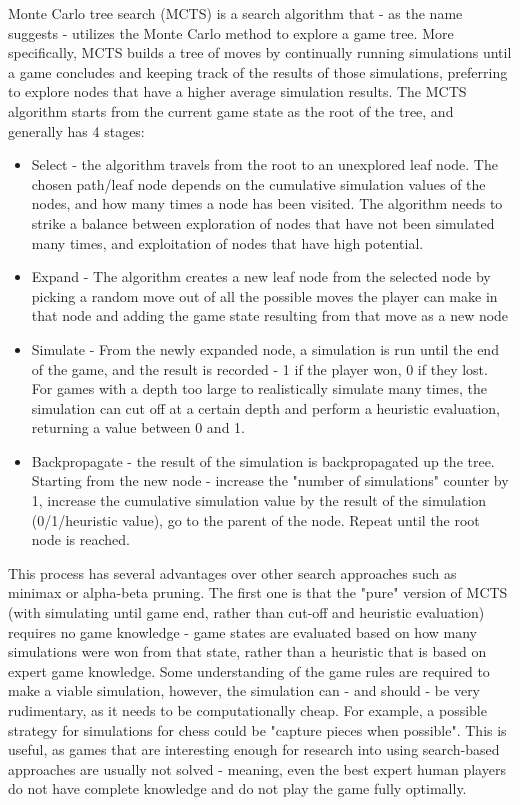 Monte Carlo tree search (MCTS) \cite{Coulom2007MonteCarlo} is a search algorithm that - as the name suggests - utilizes the Monte Carlo method to explore a game tree. More specifically, MCTS builds a tree of moves by continually running simulations until a game concludes and keeping track of the results of those simulations, preferring to explore nodes that have a higher average simulation results. The MCTS algorithm starts from the current game state as the root of the tree, and generally has 4 stages:
\begin{itemize}
\item Select - the algorithm travels from the root to an unexplored leaf node. The chosen path/leaf node depends on the cumulative simulation values of the nodes, and how many times a node has been visited. The algorithm needs to strike a balance between exploration of nodes that have not been simulated many times, and exploitation of nodes that have high potential.
\item Expand - The algorithm creates a new leaf node from the selected node by picking a random move out of all the possible moves the player can make in that node and adding the game state resulting from that move as a new node
\item Simulate - From the newly expanded node, a simulation is run until the end of the game, and the result is recorded - 1 if the player won, 0 if they lost. For games with a depth too large to realistically simulate many times, the simulation can cut off at a certain depth and perform a heuristic evaluation, returning a value between 0 and 1.
\item Backpropagate - the result of the simulation is backpropagated up the tree. Starting from the new node - increase the "number of simulations" counter by 1, increase the cumulative simulation value by the result of the simulation (0/1/heuristic value), go to the parent of the node. Repeat until the root node is reached.
\end{itemize}

This process has several advantages over other search approaches such as minimax or alpha-beta pruning. The first one is that the "pure" version of MCTS (with simulating until game end, rather than cut-off and heuristic evaluation) requires no game knowledge - game states are evaluated based on how many simulations were won from that state, rather than a heuristic that is based on expert game knowledge. Some understanding of the game rules are required to make a viable simulation, however, the simulation can - and should - be very rudimentary, as it needs to be computationally cheap. For example, a possible strategy for simulations for chess could be "capture pieces when possible". This is useful, as games that are interesting enough for research into using search-based approaches are usually not solved - meaning, even the best expert human players do not have complete knowledge and do not play the game fully optimally.


